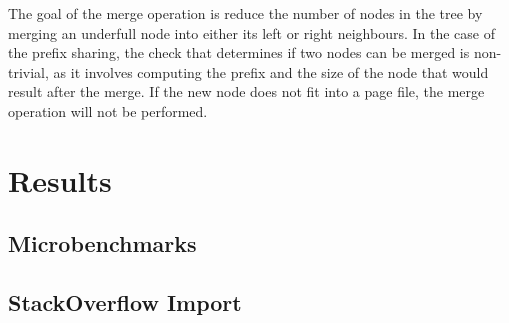 \documentclass[11pt,a4paper,oneside]{article}
\begin{document}
The goal of the merge operation is reduce the number of nodes in the tree by merging an underfull node into either its left or right neighbours. In the case of the prefix sharing, the check that determines if two nodes can be merged is non-trivial, as it involves computing the prefix and the size of the node that would result after the merge. If the new node does not fit into a page file, the merge operation will not be performed.


\section{Results}
% 
% 
% 
% 
\subsection{Microbenchmarks} %
\label{sub:microbenchmarks}


\subsection{StackOverflow Import} %
\label{sub:stackoverflow_import}
\end{document}
